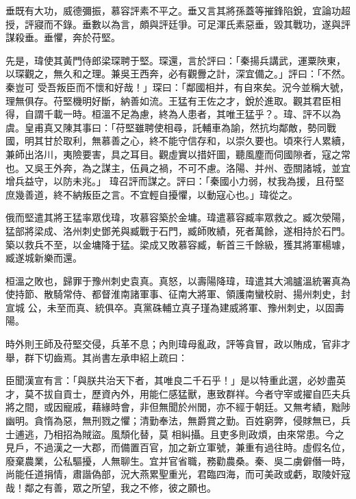 \begin{pinyinscope}
 垂既有大功，威德彌振，慕容評素不平之。垂又言其將孫蓋等摧鋒陷銳，宜論功超授，評寢而不錄。垂數以為言，頗與評廷爭。可足渾氏素惡垂，毀其戰功，遂與評謀殺垂。垂懼，奔於苻堅。



 先是，瑋使其黃門侍郎梁琛聘于堅。琛還，言於評曰：「秦揚兵講武，運粟陜東，以琛觀之，無久和之理。兼吳王西奔，必有觀釁之計，深宜備之。」評曰：「不然。秦豈可
 受吾叛臣而不懷和好哉！」琛曰：「鄰國相并，有自來矣。況今並稱大號，理無俱存。苻堅機明好斷，納善如流。王猛有王佐之才，銳於進取。觀其君臣相得，自謂千載一時。桓溫不足為慮，終為人患者，其唯王猛乎？。瑋、評不以為虞。皇甫真又陳其事曰：「苻堅雖聘使相尋，託輔車為諭，然抗均鄰敵，勢同戰國，明其甘於取利，無慕善之心，終不能守信存和，以崇久要也。頃來行人累續，兼師出洛川，夷險要害，具之耳目。觀虛實以措奸圖，聽風塵而伺國隙者，寇之常也。又吳王外奔，為之謀主，伍員之禍，不可不慮。洛陽、并州、壺關諸城，並宜增兵益守，以防未兆。」
 瑋召評而謀之。評曰：「秦國小力弱，杖我為援，且苻堅庶幾善道，終不納叛臣之言。不宜輕自擾懼，以動寇心也。」瑋從之。



 俄而堅遣其將王猛率眾伐瑋，攻慕容築於金墉。瑋遣慕容臧率眾救之。臧次滎陽，猛部將梁成、洛州刺史鄧羌與臧戰于石門，臧師敗績，死者萬餘，遂相持於石門。築以救兵不至，以金墉降于猛。梁成又敗慕容臧，斬首三千餘級，獲其將軍楊璩，臧遂城新樂而還。



 桓溫之敗也，歸罪于豫州刺史袁真。真怒，以壽陽降瑋，瑋遣其大鴻臚溫統署真為使持節、散騎常侍、都督淮南諸軍事、征南大將軍、領護南蠻校尉、揚州刺史，封宣城
 公，未至而真、統俱卒。真黨硃輔立真子瑾為建威將軍、豫州刺史，以固壽陽。



 時外則王師及苻堅交侵，兵革不息；內則瑋母亂政，評等貪冒，政以賄成，官非才舉，群下切齒焉。其尚書左承申紹上疏曰：



 臣聞漢宣有言：「與朕共治天下者，其唯良二千石乎！」是以特重此選，必妙盡英才，莫不拔自貢士，歷資內外，用能仁感猛獸，惠致群祥。今者守宰或擢自匹夫兵將之間，或因寵戚，藉緣時會，非但無聞於州閭，亦不經于朝廷。又無考績，黜陟幽明。貪惰為惡，無刑戮之懼；清勤奉法，無爵賞之勤。百姓窮弊，侵賕無已，兵士逋逃，乃相招為賊盜。風頹化替，莫
 相糾攝。且吏多則政煩，由來常患。今之見戶，不過漢之一大郡，而備置百官，加之新立軍號，兼重有過往時。虛假名位，廢棄農業，公私驅擾，人無聊生。宜并官省職，務勸農桑。秦、吳二虜僻僭一時，尚能任道捐情，肅諧偽部，況大燕累聖重光，君臨四海，而可美政或虧，取陵奸寇哉！鄰之有善，眾之所望，我之不修，彼之願也。




\end{pinyinscope}
